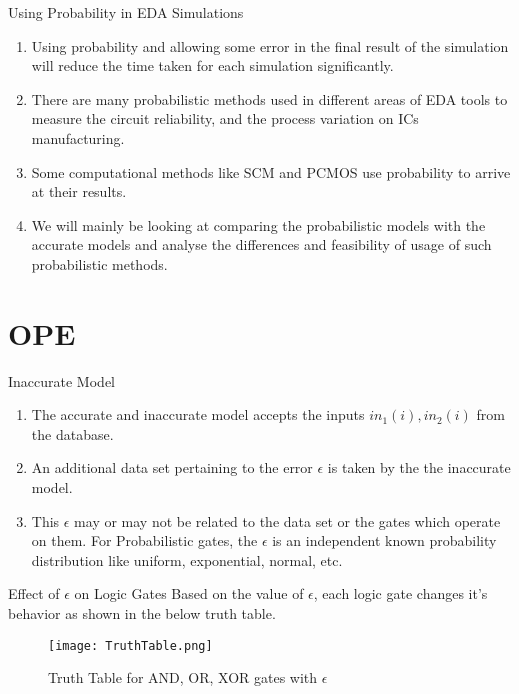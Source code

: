 \documentclass{beamer}
\begin{document}
\begin{frame}{Using Probability in EDA Simulations}
\begin{block}{}
\begin{enumerate}

    \item Using probability and allowing some error in the final result of the simulation will reduce the time taken for each simulation significantly.
    \item There are many probabilistic methods used in different areas of EDA tools to measure the circuit reliability, and the process variation on ICs manufacturing.
    \item Some computational methods like SCM and PCMOS use probability to arrive at their results.
    \item We will mainly be looking at comparing the probabilistic models with the accurate models and analyse the differences and feasibility of usage of such probabilistic methods.
    
\end{enumerate}
\end{block}

\end{frame}

\section{OPE}
\begin{frame}{Inaccurate Model}
\begin{enumerate}
    \item The accurate and inaccurate model accepts the inputs $in_1 (i) , in_2 (i)$ from the database. 
    \item An additional data set pertaining to the error $\epsilon$ is taken by the the inaccurate model.
    \item This $\epsilon$ may or may not be related to the data set or the gates which operate on them. For Probabilistic gates, the $\epsilon$ is an independent known probability distribution like uniform, exponential, normal, etc.
    \end{enumerate}
\end{frame}

\begin{frame}{Effect of $\epsilon$ on Logic Gates}
Based on the value of $\epsilon$, each logic gate changes it's behavior as shown in the below truth table.
\begin{figure}
    \centering
    \texttt{[image: TruthTable.png]}
    \caption{Truth Table for AND, OR, XOR gates with $\epsilon$}
    \label{fig:my_label}
\end{figure}
\end{frame}
\end{document}
